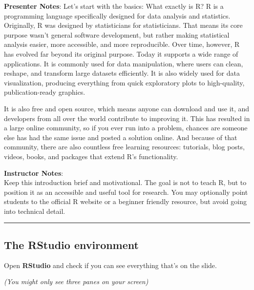 \documentclass[
  letterpaper,
  DIV=11,
  numbers=noendperiod]{scrartcl}
\begin{document}
\textbf{Presenter Notes}: Let's start with the basics: What exactly is
R? R is a programming language specifically designed for data analysis
and statistics. Originally, R was designed by statisticians for
statisticians. That means its core purpose wasn't general software
development, but rather making statistical analysis easier, more
accessible, and more reproducible. Over time, however, R has evolved far
beyond its original purpose. Today it supports a wide range of
applications. It is commonly used for data manipulation, where users can
clean, reshape, and transform large datasets efficiently. It is also
widely used for data visualization, producing everything from quick
exploratory plots to high-quality, publication-ready graphics.

It is also free and open source, which means anyone can download and use
it, and developers from all over the world contribute to improving it.
This has resulted in a large online community, so if you ever run into a
problem, chances are someone else has had the same issue and posted a
solution online. And because of that community, there are also countless
free learning resources: tutorials, blog posts, videos, books, and
packages that extend R's functionality.

\textbf{Instructor Notes}:\\
Keep this introduction brief and motivational. The goal is not to teach
R, but to position it as an accessible and useful tool for research. You
may optionally point students to the official R website or a beginner
friendly resource, but avoid going into technical detail.

\begin{center}\rule{0.5\linewidth}{0.5pt}\end{center}

\subsection{The RStudio environment}\label{the-rstudio-environment}

Open \textbf{RStudio} and check if you can see everything that's on the
slide.

\emph{(You might only see three panes on your screen)}
\end{document}
